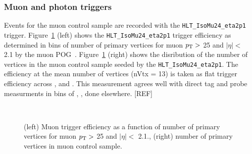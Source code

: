 \subsubsection{Muon and photon triggers\label{sec:muon_triggers}}

Events for the muon control sample are recorded with the \verb!HLT_IsoMu24_eta2p1! 
trigger. Figure~\ref{fig:eff-muon} (left) shows the \verb!HLT_IsoMu24_eta2p1! 
trigger efficiency as determined in bins of number of primary vertices 
for muon $p_{\mathrm{T}} >$ 25 \gev and $|\eta| <$ 2.1 by the muon POG~\cite{ref:muon-eff}.
Figure~\ref{fig:eff-muon} (right) shows the disribution of the number 
of vertices in the muon control sample seeded by the \verb!HLT_IsoMu24_eta2p1!. 
The efficiency at the mean number of vertices (nVtx = 13) is taken as flat
trigger efficiency across \njet, \nb and \scalht. This measurement 
agrees well with direct tag and probe measurments in bins of 
\njet, \nb, \scalht done elsewhere. [REF]

\begin{figure}[!h]
  \begin{center}
  \\     
    \caption{\label{fig:eff-muon}
    (left) Muon trigger efficiency as a function of
    number of primary vertices for muon $p_{\mathrm{T}}>$ 25 \gev and
    $|\eta| <$ 2.1., (right) number of primary vertices
    in muon control sample.} 
 
  \end{center}
\end{figure}

